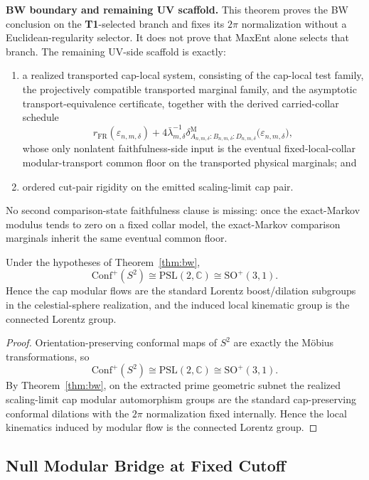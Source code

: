 \textbf{BW boundary and remaining UV scaffold.} This theorem proves the BW conclusion on the \textbf{T1}-selected branch and fixes its \(2\pi\) normalization without a Euclidean-regularity selector. It does not prove that MaxEnt alone selects that branch. The remaining UV-side scaffold is exactly:
\begin{enumerate}[leftmargin=2em]
\item a realized transported cap-local system, consisting of the cap-local test family, the projectively compatible transported marginal family, and the asymptotic transport-equivalence certificate, together with the derived carried-collar schedule
\[
r_{\mathrm{FR}}(\varepsilon_{n,m,\delta})
+
4\bar\lambda_{m,\delta}^{-1}
\delta^{\mathrm M}_{A_{n,m,\delta}:B_{n,m,\delta}:D_{n,m,\delta}}
\bigl(\varepsilon_{n,m,\delta}\bigr),
\]
whose only nonlatent faithfulness-side input is the eventual fixed-local-collar modular-transport common floor on the transported physical marginals; and
\item ordered cut-pair rigidity on the emitted scaling-limit cap pair.
\end{enumerate}
No second comparison-state faithfulness clause is missing: once the exact-Markov modulus tends to zero on a fixed collar model, the exact-Markov comparison marginals inherit the same eventual common floor.

\begin{corollary}\label{cor:lorentz}
Under the hypotheses of Theorem~\ref{thm:bw},
\[
\mathrm{Conf}^+(S^2)\cong \mathrm{PSL}(2,\mathbb C)\cong \mathrm{SO}^+(3,1).
\]
Hence the cap modular flows are the standard Lorentz boost/dilation subgroups in the celestial-sphere realization, and the induced local kinematic group is the connected Lorentz group.
\end{corollary}

\begin{proof}
Orientation-preserving conformal maps of \(S^2\) are exactly the M\"obius transformations, so
\[
\mathrm{Conf}^+(S^2)\cong \mathrm{PSL}(2,\mathbb C)\cong \mathrm{SO}^+(3,1).
\]
By Theorem~\ref{thm:bw}, on the extracted prime geometric subnet the realized scaling-limit cap modular automorphism groups are the standard cap-preserving conformal dilations with the \(2\pi\) normalization fixed internally. Hence the local kinematics induced by modular flow is the connected Lorentz group.
\end{proof}
\subsection{Null Modular Bridge at Fixed Cutoff}\label{23-null-modular-bridge-eft-conditions-n1-n3}

